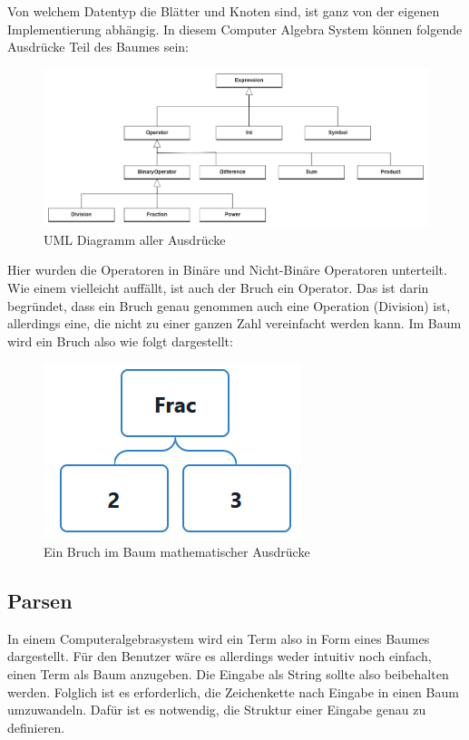 \documentclass[11pt]{article}
\begin{document}
Von welchem Datentyp die Blätter und Knoten sind, ist ganz von der eigenen Implementierung abhängig.
In diesem Computer Algebra System können folgende Ausdrücke Teil des Baumes sein:

\begin{figure}[h]
  \centering
  \includegraphics[scale=0.25]{UML_Ausdruecke.png}
  \caption{UML Diagramm aller Ausdrücke}
\end{figure}

Hier wurden die Operatoren in Binäre und Nicht-Binäre Operatoren unterteilt. 
Wie einem vielleicht auffällt, ist auch der Bruch ein Operator. 
Das ist darin begründet, dass ein Bruch genau genommen auch eine Operation (Division) ist, 
allerdings eine, die nicht zu einer ganzen Zahl vereinfacht werden kann. 
Im Baum wird ein Bruch also wie folgt dargestellt:

\begin{figure}[h]
  \centering
  \includegraphics[scale=0.5]{trees/beispiel_baum_frac.png}
  \caption{Ein Bruch im Baum mathematischer Ausdrücke}
\end{figure}

\subsection{Parsen}
In einem Computeralgebrasystem wird ein Term also in Form eines Baumes dargestellt. 
Für den Benutzer wäre es allerdings weder intuitiv noch einfach, einen Term als Baum anzugeben. 
Die Eingabe als String sollte also beibehalten werden. 
Folglich ist es erforderlich, die Zeichenkette nach Eingabe in einen Baum umzuwandeln.
Dafür ist es notwendig, die Struktur einer Eingabe genau zu definieren.
\end{document}
